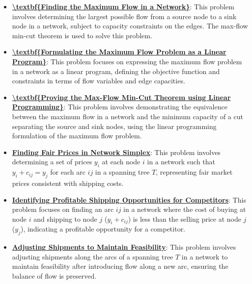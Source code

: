 \documentclass{article}%
\begin{document}
\begin{itemize}[leftmargin=*]%
\item \href{https://www.math.purdue.edu/~yipn/421//2024-11-19-MaxFlowMinCut.pdf#page=1}{\textbf{\textbackslash{}textbf\{Finding the Maximum Flow in a Network\}}}: This problem involves determining the largest possible flow from a source node to a sink node in a network, subject to capacity constraints on the edges.  The max-flow min-cut theorem is used to solve this problem.%
\item \href{https://www.math.purdue.edu/~yipn/421//2024-11-19-MaxFlowMinCut.pdf#page=14}{\textbf{\textbackslash{}textbf\{Formulating the Maximum Flow Problem as a Linear Program\}}}: This problem focuses on expressing the maximum flow problem in a network as a linear program, defining the objective function and constraints in terms of flow variables and edge capacities.%
\item \href{https://www.math.purdue.edu/~yipn/421//2024-11-19-MaxFlowMinCut.pdf#page=8}{\textbf{\textbackslash{}textbf\{Proving the Max{-}Flow Min{-}Cut Theorem using Linear Programming\}}}: This problem involves demonstrating the equivalence between the maximum flow in a network and the minimum capacity of a cut separating the source and sink nodes, using the linear programming formulation of the maximum flow problem.%
\end{itemize}%
\begin{itemize}[leftmargin=*]%
\item \href{https://www.math.purdue.edu/~yipn/421//2024-11-21-EconNetSimplex.pdf#page=4}{\textbf{Finding Fair Prices in Network Simplex}}: This problem involves determining a set of prices $y_i$ at each node $i$ in a network such that $y_i + c_{ij} = y_j$ for each arc $ij$ in a spanning tree $T$, representing fair market prices consistent with shipping costs.%
\item \href{https://www.math.purdue.edu/~yipn/421//2024-11-21-EconNetSimplex.pdf#page=5}{\textbf{Identifying Profitable Shipping Opportunities for Competitors}}: This problem focuses on finding an arc $ij$ in a network where the cost of buying at node $i$ and shipping to node $j$ ($y_i + c_{ij}$) is less than the selling price at node $j$ ($y_j$), indicating a profitable opportunity for a competitor.%
\item \href{https://www.math.purdue.edu/~yipn/421//2024-11-21-EconNetSimplex.pdf#page=6}{\textbf{Adjusting Shipments to Maintain Feasibility}}: This problem involves adjusting shipments along the arcs of a spanning tree $T$ in a network to maintain feasibility after introducing flow along a new arc, ensuring the balance of flow is preserved.%
\end{itemize}%
\end{document}
